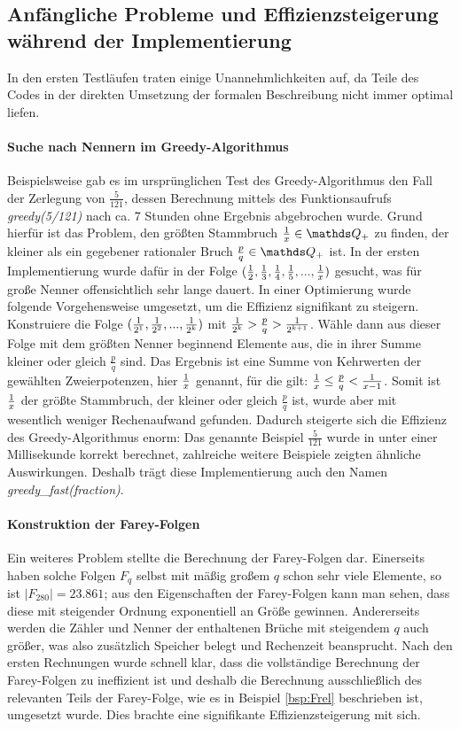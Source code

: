 \subsection{Anfängliche Probleme und Effizienzsteigerung während der Implementierung}
In den ersten Testläufen traten einige Unannehmlichkeiten auf, da Teile des Codes in der direkten Umsetzung der formalen Beschreibung nicht immer optimal liefen.

\paragraph{Suche nach Nennern im Greedy-Algorithmus}Beispielsweise gab es im ursprünglichen Test des Greedy-Algorithmus den Fall der Zerlegung von $\frac{5}{121}$, dessen Berechnung mittels des Funktionsaufrufs \emph{greedy(5/121)} nach ca. 7 Stunden ohne Ergebnis abgebrochen wurde. Grund hierfür ist das Problem, den größten Stammbruch $\uf{x} \in \Q_+$ zu finden, der kleiner als ein gegebener rationaler Bruch $\frac{p}{q} \in \Q_+$ ist. In der ersten Implementierung wurde dafür in der Folge $(\frac{1}{2}, \frac{1}{3}, \frac{1}{4}, \frac{1}{5},...,\frac{1}{x})$ gesucht, was für große Nenner offensichtlich sehr lange dauert. In einer Optimierung wurde folgende Vorgehensweise umgesetzt, um die Effizienz signifikant zu steigern. Konstruiere die Folge $(\frac{1}{2^1}, \frac{1}{2^2}, ..., \frac{1}{2^k})$ mit $\frac{1}{2^k} > \frac{p}{q} > \frac{1}{2^{k+1}}$. Wähle dann aus dieser Folge mit dem größten Nenner beginnend Elemente aus, die in ihrer Summe kleiner oder gleich $\frac{p}{q}$ sind. Das Ergebnis ist eine Summe von Kehrwerten der gewählten Zweierpotenzen, hier $\frac{1}{x}$ genannt, für die gilt: $\frac{1}{x} \leq \frac{p}{q} < \frac{1}{x-1}$. Somit ist $\frac{1}{x}$ der größte Stammbruch, der kleiner oder gleich $\frac{p}{q}$ ist, wurde aber mit wesentlich weniger Rechenaufwand gefunden.
Dadurch steigerte sich die Effizienz des Greedy-Algorithmus enorm: Das genannte Beispiel $\frac{5}{121}$ wurde in unter einer Millisekunde korrekt berechnet, zahlreiche weitere Beispiele zeigten ähnliche Auswirkungen. Deshalb trägt diese Implementierung auch den Namen \emph{greedy\_fast(fraction)}.

\paragraph{Konstruktion der Farey-Folgen}Ein weiteres Problem stellte die Berechnung der Farey-Folgen dar. Einerseits haben solche Folgen $F_q$ selbst mit mäßig großem $q$ schon sehr viele Elemente, so ist \zB $|F_{280}| = 23.861$; aus den Eigenschaften der Farey-Folgen kann man sehen, dass diese mit steigender Ordnung exponentiell an Größe gewinnen. Andererseits werden die Zähler und Nenner der enthaltenen Brüche mit steigendem $q$ auch größer, was also zusätzlich Speicher belegt und Rechenzeit beansprucht. Nach den ersten Rechnungen wurde schnell klar, dass die vollständige Berechnung der Farey-Folgen zu ineffizient ist und deshalb die Berechnung ausschließlich des relevanten Teils der Farey-Folge, wie es in Beispiel \ref{bsp:Frel} beschrieben ist, umgesetzt wurde. Dies brachte eine signifikante Effizienzsteigerung mit sich.


